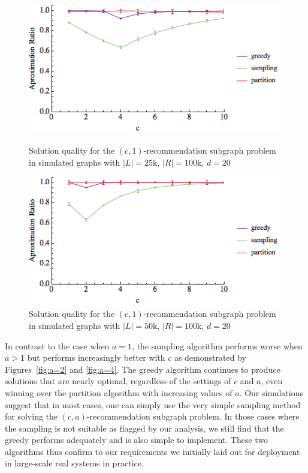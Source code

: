 \begin{figure}[t]
\centering
\begin{minipage}[h]{0.48\textwidth}
\centering
\includegraphics[width=0.99\textwidth]{images/l=25000,r=100000_Greedy_vs_Naive_error.png}
\vspace{-1cm}
\caption{Solution quality for the $(c, 1)$-recommendation subgraph problem in simulated graphs with $|L|=25$k, $|R|=100$k, $d=20$}\label{fig:a=1:1}
\end{minipage}
\vspace{.2cm}
\hspace{0cm}
\begin{minipage}[h]{0.48\textwidth}
\centering
\includegraphics[width=0.99\textwidth]{images/l=50000,r=100000_Greedy_vs_Naive_error.png}
\vspace{-1cm}
\caption{Solution quality for the $(c, 1)$-recommendation subgraph problem in simulated graphs with $|L|=50$k, $|R|=100$k, $d=20$}\label{fig:a=1:2}
\end{minipage}
\end{figure}


\vs In contrast to the case when $a=1$, the sampling algorithm
performs worse when $a>1$ but performs increasingly better with $c$ as
demonstrated by Figures~\ref{fig:a=2} and \ref{fig:a=4}. The greedy
algorithm continues to produce solutions that are nearly optimal,
regardless of the settings of $c$ and $a$, even winning over the
partition algorithm with increasing values of $a$. Our simulations
suggest that in most cases, one can simply use the very simple
sampling method for solving the $(c, a)$-recommendation subgraph
problem. In those cases where the sampling is not suitable as flagged
by our analysis, we still find that the greedy performs adequately and
is also simple to implement. These two algorithms thus confirm to our
requirements we initially laid out for deployment in large-scale real
systems in practice.


